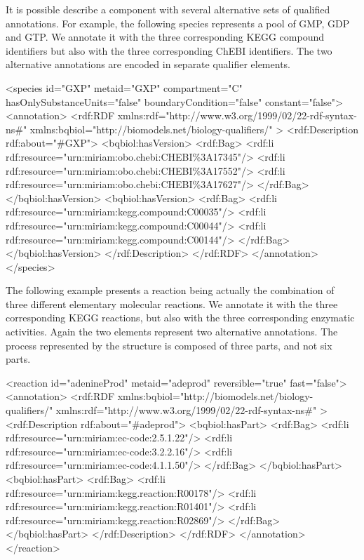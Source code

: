 It is possible describe a component with several alternative sets
of qualified annotations. For example, the following species
represents a pool of  GMP, GDP and GTP. We annotate it with the
three corresponding KEGG compound identifiers but also with the
three corresponding ChEBI identifiers.  The two alternative
annotations are encoded in separate  qualifier
elements.

\begin{example}
<species id="GXP" metaid="GXP" compartment="C"
         hasOnlySubstanceUnits="false" boundaryCondition="false"
         constant="false">
  <annotation>
    <rdf:RDF
      xmlns:rdf="http://www.w3.org/1999/02/22-rdf-syntax-ns\#"
      xmlns:bqbiol="http://biomodels.net/biology-qualifiers/"
    >
      <rdf:Description rdf:about="\#GXP">
        <bqbiol:hasVersion>
          <rdf:Bag>
            <rdf:li rdf:resource="urn:miriam:obo.chebi:CHEBI\%3A17345"/>
            <rdf:li rdf:resource="urn:miriam:obo.chebi:CHEBI\%3A17552"/>
            <rdf:li rdf:resource="urn:miriam:obo.chebi:CHEBI\%3A17627"/>
          </rdf:Bag>
        </bqbiol:hasVersion>
        <bqbiol:hasVersion>
          <rdf:Bag>
            <rdf:li rdf:resource="urn:miriam:kegg.compound:C00035"/>
            <rdf:li rdf:resource="urn:miriam:kegg.compound:C00044"/>
            <rdf:li rdf:resource="urn:miriam:kegg.compound:C00144"/>
          </rdf:Bag>
        </bqbiol:hasVersion>
      </rdf:Description>
    </rdf:RDF>
  </annotation>
</species>
\end{example}

The following example presents a reaction being actually the
combination of three different elementary molecular reactions. We
annotate it with the three corresponding KEGG reactions, but also
with the three corresponding enzymatic activities.  Again the two
 elements represent two alternative annotations.
The process represented by the \Reaction structure is
composed of three parts, and  not six parts.

\begin{example}
<reaction id="adenineProd" metaid="adeprod" reversible="true" fast="false">
  <annotation>
    <rdf:RDF
      xmlns:bqbiol="http://biomodels.net/biology-qualifiers/"
      xmlns:rdf="http://www.w3.org/1999/02/22-rdf-syntax-ns\#"
    >
      <rdf:Description rdf:about="\#adeprod">
        <bqbiol:hasPart>
          <rdf:Bag>
            <rdf:li rdf:resource="urn:miriam:ec-code:2.5.1.22"/>
            <rdf:li rdf:resource="urn:miriam:ec-code:3.2.2.16"/>
            <rdf:li rdf:resource="urn:miriam:ec-code:4.1.1.50"/>
          </rdf:Bag>
        </bqbiol:hasPart>
        <bqbiol:hasPart>
          <rdf:Bag>
            <rdf:li rdf:resource="urn:miriam:kegg.reaction:R00178"/>
            <rdf:li rdf:resource="urn:miriam:kegg.reaction:R01401"/>
            <rdf:li rdf:resource="urn:miriam:kegg.reaction:R02869"/>
          </rdf:Bag>
        </bqbiol:hasPart>
      </rdf:Description>
    </rdf:RDF>
  </annotation>
</reaction>
\end{example}

